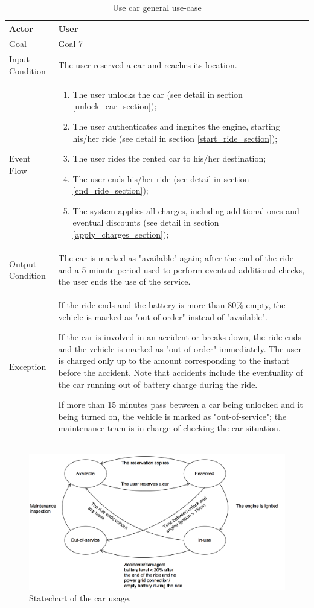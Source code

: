 \begin{table}[H]
\begin{center}
\begin{tabular}{p{} | p{}}
\hline
Actor & User\\
\hline
Goal & Goal 7\\
\hline
Input Condition & The user reserved a car and reaches its location.\\
\hline
Event Flow & 
\begin{enumerate}
\item The user unlocks the car (see detail in section \ref{unlock_car_section});
\item The user authenticates and ingnites the engine, starting his/her ride (see detail in section \ref{start_ride_section});
\item The user rides the rented car to his/her destination;
\item The user ends his/her ride (see detail in section \ref{end_ride_section});
\item The system applies all charges, including additional ones and eventual discounts (see detail in section \ref{apply_charges_section});
\end{enumerate} \\
\hline
Output Condition & The car is marked as "available" again; after the end of the ride and a 5 minute period used to perform eventual additional checks, the user ends the use of the service.\\
\hline
Exception & If the ride ends and the battery is more than 80\% empty, the vehicle is marked as "out-of-order" instead of "available".

If the car is involved in an accident or breaks down, the ride ends and the vehicle is marked as "out-of order" immediately. The user is charged only up to the amount corresponding to the instant before the accident. Note that accidents include the eventuality of the car running out of battery charge during the ride.

If more than 15 minutes pass between a car being unlocked and it being turned on, the vehicle is marked as "out-of-service"; the maintenance team is in charge of checking the car situation.\\
\hline
\end{tabular}
\end{center}
\caption{Use car general use-case}
\label{use_car_uc}
\end{table}

\begin{figure}[H]
\begin{center}
		\includegraphics[width=\textwidth]{./specific_requirements/features/diagrams/use_car_sc.png}
		\caption{Statechart of the car usage.}
		\label{use_car_sc}
\end{center}
\end{figure}
